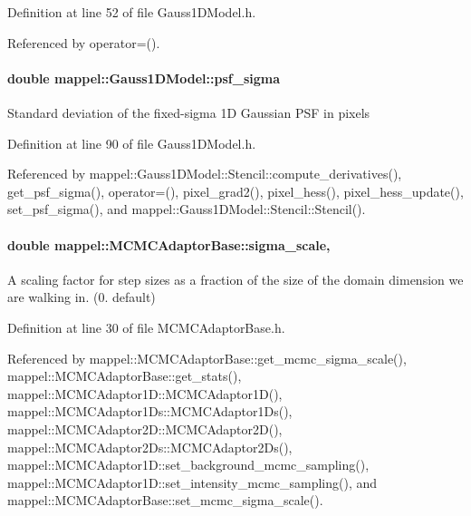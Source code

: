 Definition at line 52 of file Gauss1\+D\+Model.\+h.



Referenced by operator=().

\paragraph[{\texorpdfstring{psf\+\_\+sigma}{psf_sigma}}]{\setlength{\rightskip}{0pt plus 5cm}double mappel\+::\+Gauss1\+D\+Model\+::psf\+\_\+sigma\hspace{0.3cm}{\ttfamily [protected]}}\hypertarget{classmappel_1_1Gauss1DModel_a62c6b2a5d8ab5f5596504a19daed66b2}{}\label{classmappel_1_1Gauss1DModel_a62c6b2a5d8ab5f5596504a19daed66b2}
Standard deviation of the fixed-\/sigma 1D Gaussian P\+SF in pixels 

Definition at line 90 of file Gauss1\+D\+Model.\+h.



Referenced by mappel\+::\+Gauss1\+D\+Model\+::\+Stencil\+::compute\+\_\+derivatives(), get\+\_\+psf\+\_\+sigma(), operator=(), pixel\+\_\+grad2(), pixel\+\_\+hess(), pixel\+\_\+hess\+\_\+update(), set\+\_\+psf\+\_\+sigma(), and mappel\+::\+Gauss1\+D\+Model\+::\+Stencil\+::\+Stencil().

\paragraph[{\texorpdfstring{sigma\+\_\+scale}{sigma_scale}}]{\setlength{\rightskip}{0pt plus 5cm}double mappel\+::\+M\+C\+M\+C\+Adaptor\+Base\+::sigma\+\_\+scale\hspace{0.3cm}{\ttfamily [protected]}, {\ttfamily [inherited]}}\hypertarget{classmappel_1_1MCMCAdaptorBase_a76312f7d589bf3f3e754beca174b884b}{}\label{classmappel_1_1MCMCAdaptorBase_a76312f7d589bf3f3e754beca174b884b}
A scaling factor for step sizes as a fraction of the size of the domain dimension we are walking in. (0. default) 

Definition at line 30 of file M\+C\+M\+C\+Adaptor\+Base.\+h.



Referenced by mappel\+::\+M\+C\+M\+C\+Adaptor\+Base\+::get\+\_\+mcmc\+\_\+sigma\+\_\+scale(), mappel\+::\+M\+C\+M\+C\+Adaptor\+Base\+::get\+\_\+stats(), mappel\+::\+M\+C\+M\+C\+Adaptor1\+D\+::\+M\+C\+M\+C\+Adaptor1\+D(), mappel\+::\+M\+C\+M\+C\+Adaptor1\+Ds\+::\+M\+C\+M\+C\+Adaptor1\+Ds(), mappel\+::\+M\+C\+M\+C\+Adaptor2\+D\+::\+M\+C\+M\+C\+Adaptor2\+D(), mappel\+::\+M\+C\+M\+C\+Adaptor2\+Ds\+::\+M\+C\+M\+C\+Adaptor2\+Ds(), mappel\+::\+M\+C\+M\+C\+Adaptor1\+D\+::set\+\_\+background\+\_\+mcmc\+\_\+sampling(), mappel\+::\+M\+C\+M\+C\+Adaptor1\+D\+::set\+\_\+intensity\+\_\+mcmc\+\_\+sampling(), and mappel\+::\+M\+C\+M\+C\+Adaptor\+Base\+::set\+\_\+mcmc\+\_\+sigma\+\_\+scale().


